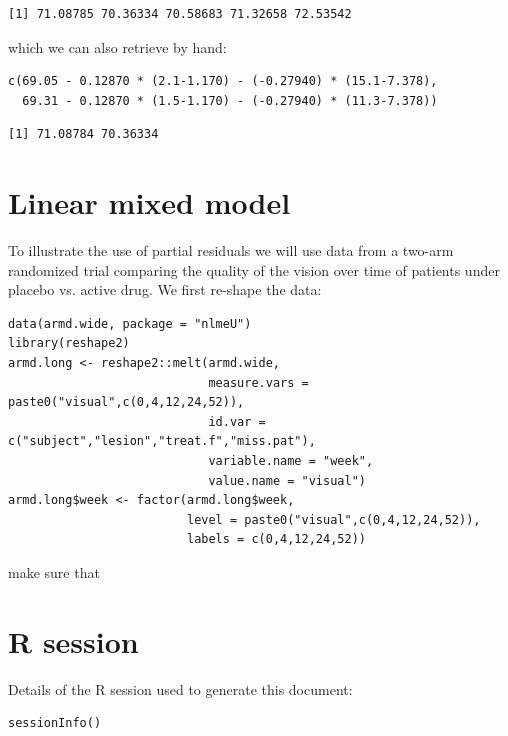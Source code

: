 \documentclass[12pt]{article}
\begin{document}
\begin{verbatim}
[1] 71.08785 70.36334 70.58683 71.32658 72.53542
\end{verbatim}


which we can also retrieve by hand:
\lstset{language=r,label= ,caption= ,captionpos=b,numbers=none}
\begin{lstlisting}
c(69.05 - 0.12870 * (2.1-1.170) - (-0.27940) * (15.1-7.378),
  69.31 - 0.12870 * (1.5-1.170) - (-0.27940) * (11.3-7.378))
\end{lstlisting}

\begin{verbatim}
[1] 71.08784 70.36334
\end{verbatim}



\clearpage

\section{Linear mixed model}
\label{sec:org6c35510}

To illustrate the use of partial residuals we will use data from a
two-arm randomized trial comparing the quality of the vision over time
of patients under placebo vs. active drug. We first re-shape the data:
\lstset{language=r,label= ,caption= ,captionpos=b,numbers=none}
\begin{lstlisting}
data(armd.wide, package = "nlmeU")
library(reshape2)
armd.long <- reshape2::melt(armd.wide,
                            measure.vars = paste0("visual",c(0,4,12,24,52)),
                            id.var = c("subject","lesion","treat.f","miss.pat"),
                            variable.name = "week",
                            value.name = "visual")
armd.long$week <- factor(armd.long$week, 
                         level = paste0("visual",c(0,4,12,24,52)),
                         labels = c(0,4,12,24,52))

\end{lstlisting}

make sure that 


\section{R session}
\label{sec:orgb8452f4}
Details of the R session used to generate this document:
\lstset{language=r,label= ,caption= ,captionpos=b,numbers=none}
\begin{lstlisting}
sessionInfo()
\end{lstlisting}
\end{document}
